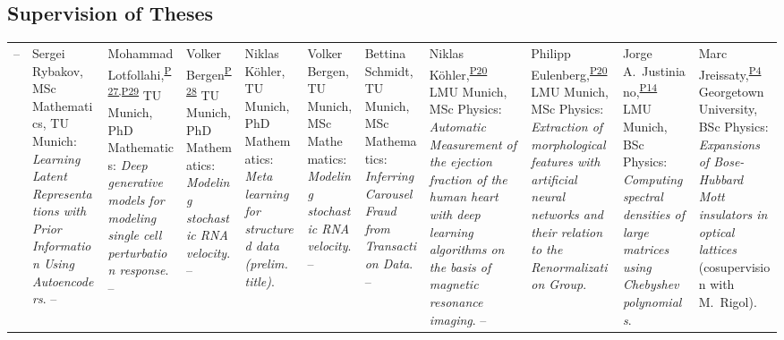 \subsection*{Supervision of Theses}
\vspace{-1em}
\begin{longtable}[t]{R{\widthC} p{\widthB}}
 -- 
& Sergei Rybakov, MSc Mathematics, TU Munich: \textit{Learning Latent Representations with Prior Information Using Autoencoders}.\newline
{} -- 
& Mohammad Lotfollahi,\textsuperscript{\hyperlink{P27}{P27,P29}} TU Munich, PhD Mathematics: \textit{Deep generative models for modeling single cell perturbation response}. \newline
{} -- 
& Volker Bergen\textsuperscript{\hyperlink{P28}{P28}} TU Munich, PhD Mathematics: \textit{Modeling stochastic RNA velocity}. \newline
{} -- 
& Niklas Köhler, TU Munich, PhD Mathematics: \textit{Meta learning for structured data (prelim.~title)}. \newline
{}  
& Volker Bergen, TU Munich, MSc Mathematics: \textit{Modeling stochastic RNA velocity}. \newline
{} --   
& Bettina Schmidt, TU Munich, MSc Mathematics: \textit{Inferring Carousel Fraud from Transaction Data}.  \newline
{} --   
& Niklas Köhler,\textsuperscript{\hyperlink{P20}{P20}} LMU Munich, MSc Physics: \textit{Automatic Measurement of the ejection fraction of the human heart with deep learning algorithms on the basis of magnetic resonance imaging}.  \newline
{} --   
& Philipp Eulenberg,\textsuperscript{\hyperlink{P20}{P20}} LMU Munich, MSc Physics: \textit{Extraction of morphological features
with artificial neural networks and their relation to the  Renormalization Group}.  \newline
{} 
& Jorge A.~Justiniano,\textsuperscript{\hyperlink{P14}{P14}} LMU Munich, BSc Physics: \textit{Computing spectral densities of large matrices using Chebyshev polynomials}. \newline
{} 
& Marc Jreissaty,\textsuperscript{\hyperlink{P4}{P4}} Georgetown University, BSc Physics: \textit{Expansions of Bose-Hubbard Mott insulators in optical lattices} (cosupervision with M.~Rigol). \newline
\end{longtable}

